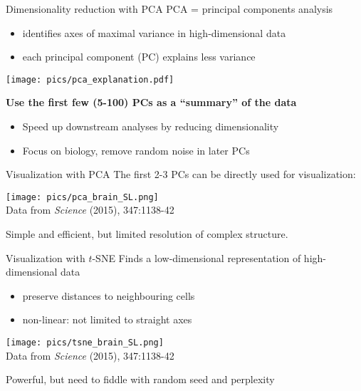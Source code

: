 \documentclass{beamer}
\begin{document}
\begin{frame}{Dimensionality reduction with PCA}
PCA = principal components analysis
\begin{itemize}
    \item identifies axes of maximal variance in high-dimensional data
    \item each principal component (PC) explains less variance 
\end{itemize}
\begin{center}
\texttt{[image: pics/pca\_explanation.pdf]}
\end{center}
\textbf{Use the first few (5-100) PCs as a ``summary'' of the data}
\begin{itemize}
\item Speed up downstream analyses by reducing dimensionality
\item Focus on biology, remove random noise in later PCs
\end{itemize}
\end{frame}


\begin{frame}{Visualization with PCA}
The first 2-3 PCs can be directly used for visualization:
\begin{center}
    \texttt{[image: pics/pca\_brain\_SL.png]} \\
    {\tiny Data from \textit{Science} (2015), 347:1138-42}
\end{center}
Simple and efficient, but limited resolution of complex structure.
\end{frame}

\begin{frame}{Visualization with $t$-SNE}
Finds a low-dimensional representation of high-dimensional data 
\begin{itemize}
    \item preserve distances to neighbouring cells
    \item non-linear: not limited to straight axes
\end{itemize}
\begin{center}
    \texttt{[image: pics/tsne\_brain\_SL.png]} \\
    {\tiny Data from \textit{Science} (2015), 347:1138-42}
\end{center}
Powerful, but need to fiddle with random seed and perplexity
\end{frame}
\end{document}
